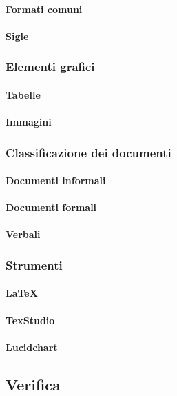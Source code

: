 		\paragraph{Formati comuni}
		\paragraph{Sigle}
	\subsubsection{Elementi grafici}
		\paragraph{Tabelle}
		\paragraph{Immagini}
	\subsubsection{Classificazione dei documenti}
		\paragraph{Documenti informali}
		\paragraph{Documenti formali}
		\paragraph{Verbali}
	\subsubsection{Strumenti}
		\paragraph{\LaTeX}
		\paragraph{TexStudio}
		\paragraph{Lucidchart}
	
\subsection{Verifica}

